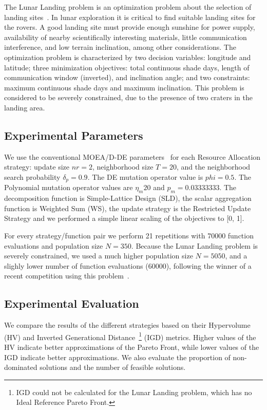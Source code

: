 The Lunar Landing problem is an optimization problem about the selection of landing sites~\citep{MoonOrbitingSatellite2015}. In lunar exploration it is critical to find suitable landing sites for the rovers. A good landing site must provide enough sunshine for power supply, availability of nearby scientifically interesting materials, little communication interference, and low terrain inclination, among other considerations. The optimization problem is characterized by two decision variables: longitude and latitude; three minimization objectives: total continuous shade days, length of communication window (inverted), and inclination angle; and two constraints: maximum continuous shade days and maximum inclination. This problem is considered to be severely constrained, due to the presence of two craters in the landing area.

\subsection{Experimental Parameters}

We use the conventional MOEA/D-DE parameters~\cite{li2009multiobjective} for each Resource Allocation strategy: update size $nr = 2$, neighborhood size $T = 20$, and the neighborhood search probability $\delta_p = 0.9$. The DE mutation operator value is $phi=0.5$. The Polynomial mutation operator values are $\eta_m 20$ and $p_m = 0.03333333$. The decomposition function is Simple-Lattice Design (SLD), the scalar aggregation function is Weighted Sum (WS), the update strategy is the Restricted Update Strategy and we performed a simple linear scaling of the objectives to [0, 1].

For every strategy/function pair we perform 21 repetitions with 70000 function evaluations and population size $N=350$. Because the Lunar Landing problem is severely constrained, we used a much higher population size $N=5050$, and a slighly lower number of function evaluations (60000), following the winner of a recent competition using this problem~\cite{Competition2018}.

\subsection{Experimental Evaluation}

We compare the results of the different strategies based on their Hypervolume (HV) and Inverted Generational Distance~\footnote{IGD could not be calculated for the Lunar Landing problem, which has no Ideal Reference Pareto Front.} (IGD) metrics. Higher values of the HV indicate better approximations of the Pareto Front, while lower values of the IGD indicate better approximations. We also evaluate the proportion of non-dominated solutions and the number of feasible solutions.

